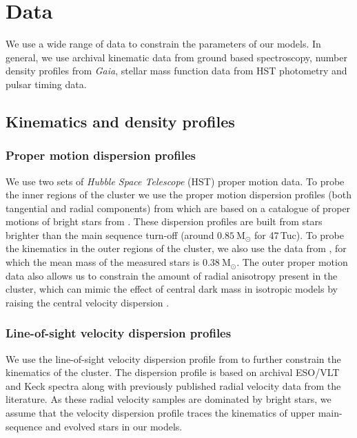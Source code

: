 \newcommand{\evolvemf}{\code{evolve\_mf}}



\section{Data}


We use a wide range of data to constrain the parameters of our models. In general, we use archival
kinematic data from ground based spectroscopy, number density profiles from \emph{Gaia}, stellar
mass function data from HST photometry and pulsar timing data.

\subsection{Kinematics and density profiles}

\subsubsection{Proper motion dispersion profiles}

We use two sets of {\it Hubble Space Telescope} (HST) proper motion data. To probe the inner regions
of the cluster we use the proper motion dispersion profiles (both tangential and radial components)
from \citet{Watkins2015} which are based on a catalogue of proper motions of bright stars from
\citet{Bellini2014}. These dispersion profiles are built from stars brighter than the main sequence
turn-off (around $0.85 \ \mathrm{M}_\odot$  for 47\,Tuc). To probe the kinematics in the outer
regions of the cluster, we also use the data from \citet{Heyl2017}, for which the mean mass of the
measured stars is $0.38 \ \mathrm{M}_{\odot}$. The outer proper motion data also allows us to
constrain the amount of radial anisotropy present in the cluster, which can mimic the effect of
central dark mass in isotropic models by raising the central velocity dispersion \citep{Zocchi2017}.


\subsubsection{Line-of-sight velocity dispersion profiles}

We use the line-of-sight velocity dispersion profile from \citet{Baumgardt2018} to further constrain
the kinematics of the cluster. The dispersion profile is based on archival ESO/VLT and Keck spectra
along with previously published radial velocity data from the literature. As these radial velocity
samples are dominated by bright stars, we assume that the velocity dispersion profile traces the
kinematics of upper main-sequence and evolved stars in our models.

